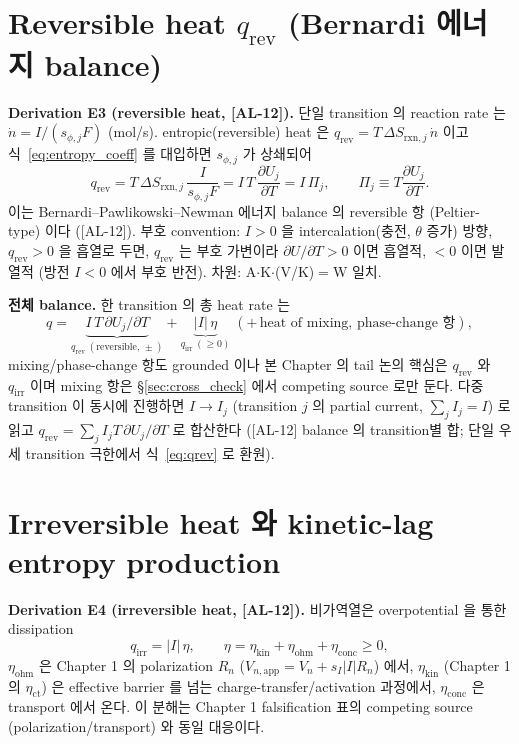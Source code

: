 \documentclass[11pt,a4paper]{article}
\newcommand{\app}{\mathrm{app}}
\newcommand{\rxn}{\mathrm{rxn}}
\newcommand{\rev}{\mathrm{rev}}
\newcommand{\irr}{\mathrm{irr}}
\newcommand{\kin}{\mathrm{kin}}
\newcommand{\ohm}{\mathrm{ohm}}
\newcommand{\conc}{\mathrm{conc}}
\newcommand{\AL}[1]{\textsf{[AL-#1]}}
\begin{document}
\section{Reversible heat $q_\rev$ (Bernardi 에너지 balance)}\label{sec:revheat}
\textbf{Derivation E3 (reversible heat, \AL{12}).} 단일 transition 의 reaction rate 는
$\dot n=I/(s_{\phi,j}F)$ (mol/s). entropic(reversible) heat 은 $q_\rev=T\,\Delta S_{\rxn,j}\,\dot n$
이고 식~\eqref{eq:entropy_coeff} 를 대입하면 $s_{\phi,j}$ 가 상쇄되어
\begin{equation}
\boxed{\;q_\rev=T\,\Delta S_{\rxn,j}\,\frac{I}{s_{\phi,j}F}=I\,T\,\frac{\partial U_j}{\partial T}
=I\,\Pi_j,\qquad \Pi_j\equiv T\frac{\partial U_j}{\partial T}.\;}
\label{eq:qrev}
\end{equation}
이는 Bernardi--Pawlikowski--Newman 에너지 balance \cite{bernardi1985} 의 reversible 항 (Peltier-
type) 이다 (\AL{12}). 부호 convention: $I>0$ 을 intercalation(충전, $\theta$ 증가) 방향, $q_\rev>0$ 을
흡열로 두면, $q_\rev$ 는 부호 가변이라 $\partial U/\partial T>0$ 이면 흡열적, $<0$ 이면 발열적
(방전 $I<0$ 에서 부호 반전). 차원: A$\cdot$K$\cdot$(V/K)$=$W 일치.

\textbf{전체 balance.} 한 transition 의 총 heat rate 는
\begin{equation}
q = \underbrace{I\,T\,\partial U_j/\partial T}_{q_\rev\ (\text{reversible, } \pm)}
+\underbrace{|I|\,\eta}_{q_\irr\ (\ge0)}\;(+\,\text{heat of mixing, phase-change 항}),
\label{eq:total_heat}
\end{equation}
mixing/phase-change 항도 grounded 이나 \cite{thomasnewman2003} 본 Chapter 의 tail 논의 핵심은
$q_\rev$ 와 $q_\irr$ 이며 mixing 항은 \S\ref{sec:cross_check} 에서 competing source 로만 둔다.
다중 transition 이 동시에 진행하면 $I\to I_j$ (transition $j$ 의 partial current, $\sum_j I_j=I$)
로 읽고 $q_\rev=\sum_j I_j T\,\partial U_j/\partial T$ 로 합산한다 (\AL{12} balance 의 transition별 합;
단일 우세 transition 극한에서 식~\eqref{eq:qrev} 로 환원).

\section{Irreversible heat 와 kinetic-lag entropy production}\label{sec:irrheat}
\textbf{Derivation E4 (irreversible heat, \AL{12}).} 비가역열은 overpotential 을 통한 dissipation
\begin{equation}
q_\irr=|I|\,\eta,\qquad \eta=\eta_\kin+\eta_\ohm+\eta_\conc\ge0,
\label{eq:qirr}
\end{equation}
$\eta_\ohm$ 은 Chapter 1 의 polarization $R_n$ ($V_{n,\app}=V_n+s_I|I|R_n$) 에서, $\eta_\kin$
(Chapter 1 의 $\eta_{\mathrm{ct}}$) 은 effective barrier 를 넘는 charge-transfer/activation
과정에서, $\eta_\conc$ 은 transport 에서 온다. 이 분해는 Chapter 1 falsification 표의 competing source (polarization/transport) 와 동일
대응이다.
\end{document}
